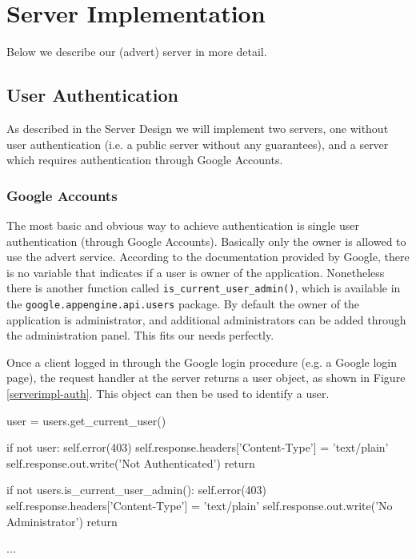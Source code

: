 \section{Server Implementation}
\label{serverimpl}
Below we describe our (advert) server in more detail.

\subsection{User Authentication}
As described in the Server Design we will implement two servers, one without user
authentication (i.e. a public server without any guarantees), and a server which
requires authentication through Google Accounts.

\subsubsection{Google Accounts}
The most basic and obvious way to achieve authentication is single user
authentication (through Google Accounts). Basically only the owner is allowed to
use the advert service. According to the documentation provided by Google, there
is no variable that indicates if a user is owner of the application. Nonetheless
there is another function called \texttt{is\_current\_user\_admin()}, which is
available in the \texttt{google.appengine.api.users} package. By default the
owner of the application is administrator, and additional administrators can be
added through the administration panel. This fits our needs perfectly.

Once a client logged in through the Google login procedure (e.g. a Google login
page), the request handler at the server returns a user object, as shown in
Figure \ref{serverimpl-auth}. This object can then be used to identify a
user.

\begin{figure*}[ht] %
\begin{center}
\begin{code}
user   = users.get_current_user()

if not user:
    self.error(403)
    self.response.headers['Content-Type'] = 'text/plain'
    self.response.out.write('Not Authenticated')
    return

if not users.is_current_user_admin():
    self.error(403)
    self.response.headers['Content-Type'] = 'text/plain'
    self.response.out.write('No Administrator')
    return
    
...
\end{code}
\caption{Authenticating a User.\label{serverimpl-auth}}
\end{center}
\end{figure*}

